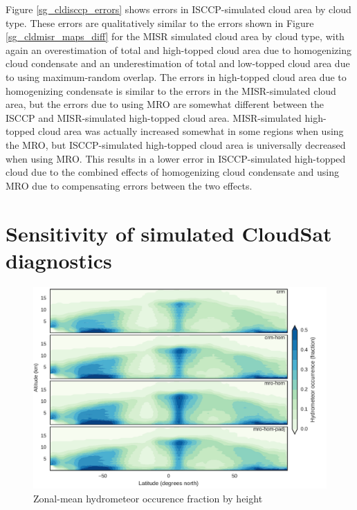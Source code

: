 Figure \ref{sg_cldisccp_errors} shows errors in ISCCP-simulated cloud area by cloud type. These errors are qualitatively similar to the errors shown in Figure \ref{sg_cldmisr_maps_diff} for the MISR simulated cloud area by cloud type, with again an overestimation of total and high-topped cloud area due to homogenizing cloud condensate and an underestimation of total and low-topped cloud area due to using maximum-random overlap. The errors in high-topped cloud area due to homogenizing condensate is similar to the errors in the MISR-simulated cloud area, but the errors due to using MRO are somewhat different between the ISCCP and MISR-simulated high-topped cloud area. MISR-simulated high-topped cloud area was actually increased somewhat in some regions when using the MRO, but ISCCP-simulated high-topped cloud area is universally decreased when using MRO. This results in a lower error in ISCCP-simulated high-topped cloud due to the combined effects of homogenizing cloud condensate and using MRO due to compensating errors between the two effects.


\section{Sensitivity of simulated CloudSat diagnostics}

\begin{figure}
\centering
\includegraphics[width=\columnwidth]{graphics/subgrid1_hfba_zonal.pdf}
\caption{Zonal-mean hydrometeor occurence fraction by height}
\label{sg_hfba_zonal}
\end{figure}

